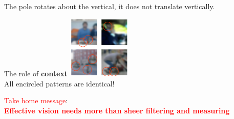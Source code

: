 \documentclass[a4paper, fontsize=8pt, landscape, DIV=1]{scrartcl}
\begin{document}
\begin{multicols*}{4}
\begin{minipage}[t]{0.49\columnwidth}
\begin{flushleft}
				The pole rotates about the vertical, it does not translate vertically.
			\end{flushleft}
		\end{minipage}
		\begin{minipage}[t]{0.49\columnwidth}
		\begin{flushright}
				{\centering The role of \textbf{context}
				\includegraphics[width=3cm, height=3cm]{images/Introduction/perc_context.png}\\}
				All encircled patterns are identical!
			\end{flushright}
		\end{minipage}
		\par 
		\textcolor{red}{Take home message}:\\
		\textbf{\textcolor{red}{Effective vision needs more than sheer filtering and measuring}}

\end{multicols*}
\end{document}
